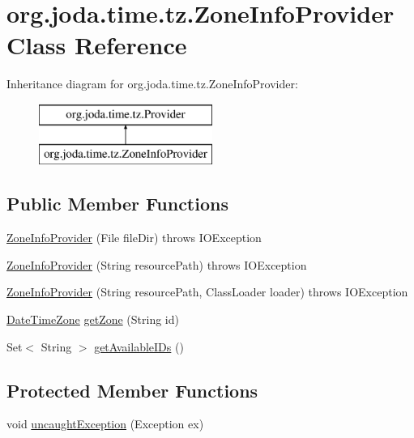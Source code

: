\hypertarget{classorg_1_1joda_1_1time_1_1tz_1_1_zone_info_provider}{\section{org.\-joda.\-time.\-tz.\-Zone\-Info\-Provider Class Reference}
\label{classorg_1_1joda_1_1time_1_1tz_1_1_zone_info_provider}
}
Inheritance diagram for org.\-joda.\-time.\-tz.\-Zone\-Info\-Provider\-:\begin{figure}[H]
\begin{center}
\leavevmode
\includegraphics[height=2.000000cm]{classorg_1_1joda_1_1time_1_1tz_1_1_zone_info_provider}
\end{center}
\end{figure}
\subsection*{Public Member Functions}
\begin{DoxyCompactItemize}
\item 
\hyperlink{classorg_1_1joda_1_1time_1_1tz_1_1_zone_info_provider_a77bc8399de952f57001f483d8a47ab6e}{Zone\-Info\-Provider} (File file\-Dir)  throws I\-O\-Exception 
\item 
\hyperlink{classorg_1_1joda_1_1time_1_1tz_1_1_zone_info_provider_a0fa7679e5f0ce5b75bcf84080560ff0a}{Zone\-Info\-Provider} (String resource\-Path)  throws I\-O\-Exception 
\item 
\hyperlink{classorg_1_1joda_1_1time_1_1tz_1_1_zone_info_provider_a8f9851b1059dee5536844b147724d95f}{Zone\-Info\-Provider} (String resource\-Path, Class\-Loader loader)  throws I\-O\-Exception     
\item 
\hyperlink{classorg_1_1joda_1_1time_1_1_date_time_zone}{Date\-Time\-Zone} \hyperlink{classorg_1_1joda_1_1time_1_1tz_1_1_zone_info_provider_a663348ffdc65d429789505620a4c56a4}{get\-Zone} (String id)
\item 
Set$<$ String $>$ \hyperlink{classorg_1_1joda_1_1time_1_1tz_1_1_zone_info_provider_acbedbba5dc4340f0e985c0cf9a40671b}{get\-Available\-I\-Ds} ()
\end{DoxyCompactItemize}
\subsection*{Protected Member Functions}
\begin{DoxyCompactItemize}
\item 
void \hyperlink{classorg_1_1joda_1_1time_1_1tz_1_1_zone_info_provider_a03b092f98fc96b73aec652ac305e28ad}{uncaught\-Exception} (Exception ex)
\end{DoxyCompactItemize}


